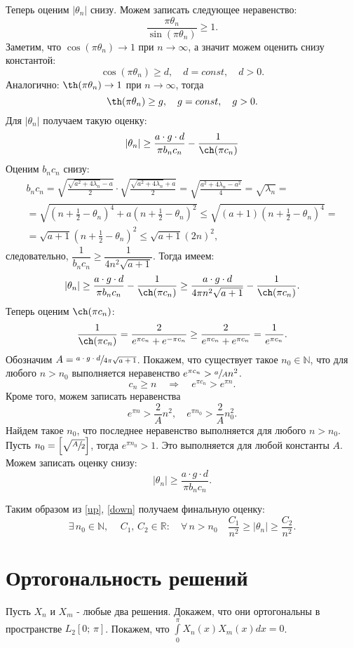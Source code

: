 \documentclass[12pt, a4paper]{article}
\begin{document}
Теперь оценим $|\theta_n|$ снизу. Можем записать следующее неравенство:
\[
\frac{\pi \theta_n}{\sin(\pi\theta_n)}\ge 1.
\]
Заметим, что $\cos(\pi \theta_n)\rightarrow1$ при $n\rightarrow\infty$, а значит можем оценить снизу константой:
\[
\cos(\pi\theta_n)\ge d, \quad d=const, \quad d>0.
\]
Аналогично: $\th(\pi \theta_n)\rightarrow1$ при $n\rightarrow\infty$, тогда
\[
\th(\pi\theta_n)\ge g, \quad g=const, \quad g>0.
\]
Для $|\theta_n|$ получаем такую оценку:
\[
|\theta_n|\ge \frac{a\cdot g\cdot d}{\pi b_n c_n} - \frac{1}{\ch(\pi c_n)}
\]
Оценим $b_n c_n$ снизу:
\begin{multline*}
b_n c_n = \sqrt{\frac{\sqrt{a^2+4\lambda_n}-a}{2}}\cdot \sqrt{\frac{\sqrt{a^2+4\lambda_n}+a}{2}} = \sqrt{\frac{a^2+4\lambda_n - a^2}{4}} = \sqrt{\lambda_n} = \\ = \sqrt{(n+\frac12 - \theta_n)^4 + a(n+\frac12 - \theta_n)^2} \le \sqrt{(a+1)(n+\frac12 - \theta_n)^4} = \\ = \sqrt{a+1}(n+\frac12 - \theta_n)^2 \le \sqrt{a+1}(2n)^2,
\end{multline*}
следовательно, $\dfrac{1}{b_n c_n} \ge \dfrac{1}{4n^2\sqrt{a+1}}$.
Тогда имеем:
\[
|\theta_n| \ge \frac{a\cdot g\cdot d}{\pi b_n c_n}-\frac{1}{\ch(\pi c_n)} \ge \frac{a\cdot g\cdot d}{4\pi n^2\sqrt{a+1}}-\frac{1}{\ch(\pi c_n)}.
\]
Теперь оценим $\ch(\pi c_n)$:
\[
\frac{1}{\ch(\pi c_n)} = \frac{2}{e^{\pi c_n}+e^{-\pi c_n}} \ge \frac{2}{e^{\pi c_n}+e^{\pi c_n}} = \frac{1}{e^{\pi c_n}}.
\]
Обозначим $A=\sfrac{a\cdot g\cdot d}{4\pi\sqrt{a+1}}$. Покажем, что существует такое $n_0\in \mathbb{N}$, что для лю\-бо\-го $n>n_0$ выполняется неравенство $e^{\pi c_n} > \sfrac{a}{A} n^2$.
\[
c_n \ge n \quad \Rightarrow \quad e^{\pi c_n} > e^{\pi n}.
\]
Кроме того, можем записать неравенства
\[
e^{\pi n}>\frac{2}{A} n^2, \quad e^{\pi n_0}>\frac{2}{A} n_0^2.
\]
Найдем такое $n_0$, что последнее неравенство выполняется для любого $n>n_0$. Пусть $n_0 = \left[\sqrt{\sfrac{A}{2}}\right]$, тогда $e^{\pi n_0}>1$. Это выполняется для любой константы $A$.
Можем записать оценку снизу:
\begin{equation}
|\theta_n| \ge \frac{a\cdot g\cdot d}{\pi b_n c_n}. \label{down}
\end{equation}

Таким образом из \eqref{up}, \eqref{down} получаем финальную оценку:
\[
\exists \, n_0\in\mathbb{N}, \quad \, C_1,\,C_2\in\mathbb{R}\colon \quad \forall\, n>n_0 \quad \frac{C_1}{n^2}\ge |\theta_n| \ge \frac{C_2}{n^2}.
\]

\section{Ортогональность решений}
Пусть $X_n$ и $X_m$ - любые два решения.
Докажем, что они ортогональны в про\-стран\-стве $L_2 [0;\,\pi]$. Покажем, что $\int\limits_0^\pi X_n(x) X_m(x) dx = 0$.
\end{document}
